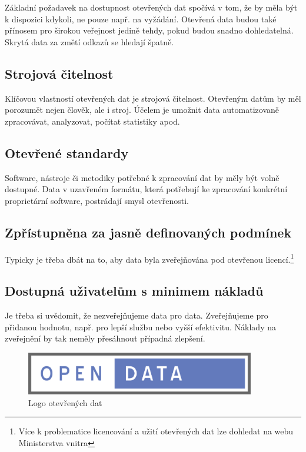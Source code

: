 Základní požadavek na dostupnost otevřených dat spočívá v tom, že by měla být k dispozici kdykoli, ne pouze např. na vyžádání. Otevřená data budou také přínosem pro širokou veřejnost jedině tehdy, pokud budou snadno dohledatelná. Skrytá data za změtí odkazů se hledají špatně.

\subsection*{Strojová čitelnost}

Klíčovou vlastností otevřených dat je strojová čitelnost. Otevřeným datům by měl porozumět nejen člověk, ale i stroj. Účelem je umožnit data automatizovaně zpracovávat, analyzovat, počítat statistiky apod.

\subsection*{Otevřené standardy}

Software, nástroje či metodiky potřebné k zpracování dat by měly být volně dostupné. Data v uzavřeném formátu, která potřebují ke zpracování konkrétní proprietární software, postrádají smysl otevřenosti.

\subsection*{Zpřístupněna za jasně definovaných podmínek}

Typicky je třeba dbát na to, aby data byla zveřejňována pod otevřenou licencí.\footnote{Více k problematice licencování a užití otevřených dat lze dohledat na webu Ministerstva vnitra\cite{mv}}

\subsection*{Dostupná uživatelům s minimem nákladů}

Je třeba si uvědomit, že nezveřejňujeme data pro data. Zveřejňujeme pro přidanou hodnotu, např. pro lepší službu nebo vyšší efektivitu. Náklady na zveřejnění by tak neměly přesáhnout případná zlepšení. 
\newline

\begin{figure}[h]
\centerline{\includegraphics[width=100mm]{img/opendata.eps}}
\caption{Logo otevřených dat}
\label{modules}
\end{figure}

